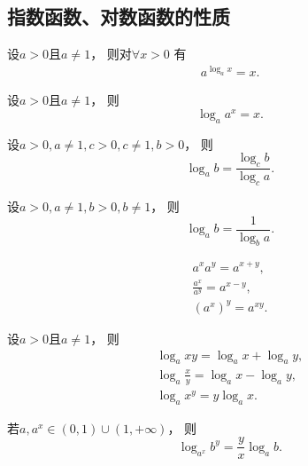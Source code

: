 \subsection{指数函数、对数函数的性质}
\begin{proposition}[对数恒等式]
设\(a>0\)且\(a\neq1\)，
则对\(\forall x>0\)
有\begin{gather}
	a^{\log_a x} = x.
\end{gather}
\end{proposition}

\begin{corollary}
设\(a>0\)且\(a\neq1\)，
则\begin{equation}
	\log_a a^x = x.
\end{equation}
\end{corollary}

\begin{theorem}[换底公式]
设\(a>0,a\neq1,c>0,c\neq1,b>0\)，
则\begin{equation}\label{equation:函数.换底公式}
	\log_a b = \frac{\log_c b}{\log_c a}.
\end{equation}
\end{theorem}

\begin{corollary}
设\(a>0,a\neq1,b>0,b\neq1\)，
则\begin{equation}
	\log_a b = \frac1{\log_b a}.
\end{equation}
\end{corollary}

\begin{property}
\begin{gather}
	a^x a^y = a^{x+y}, \\
	\frac{a^x}{a^y} = a^{x-y}, \\
	(a^x)^y = a^{xy}.
\end{gather}
\end{property}

\begin{property}
设\(a>0\)且\(a\neq1\)，
则\begin{gather}
	\log_a xy = \log_a x + \log_a y, \\
	\log_a \frac{x}{y} = \log_a x - \log_a y, \\
	\log_a x^y = y \log_a x.
\end{gather}
\end{property}

\begin{corollary}
若\(a,a^x \in (0,1)\cup(1,+\infty)\)，
则\[
	\log_{a^x} b^y = \frac{y}{x} \log_a b.
\]
\end{corollary}

